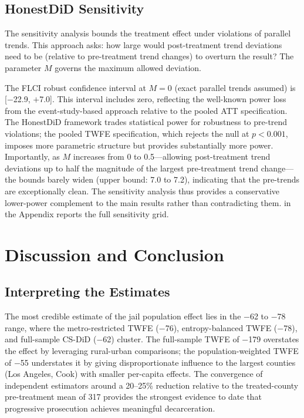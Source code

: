 \documentclass[12pt]{article}
\begin{document}


\subsection{HonestDiD Sensitivity}

The \citet{rambachan2023honest} sensitivity analysis bounds the treatment effect under violations of parallel trends. This approach asks: how large would post-treatment trend deviations need to be (relative to pre-treatment trend changes) to overturn the result? The parameter $M$ governs the maximum allowed deviation.

The FLCI robust confidence interval at $M = 0$ (exact parallel trends assumed) is [$-$22.9, $+$7.0]. This interval includes zero, reflecting the well-known power loss from the event-study-based approach relative to the pooled ATT specification. The HonestDiD framework trades statistical power for robustness to pre-trend violations; the pooled TWFE specification, which rejects the null at $p < 0.001$, imposes more parametric structure but provides substantially more power. Importantly, as $M$ increases from 0 to 0.5---allowing post-treatment trend deviations up to half the magnitude of the largest pre-treatment trend change---the bounds barely widen (upper bound: 7.0 to 7.2), indicating that the pre-trends are exceptionally clean. The sensitivity analysis thus provides a conservative lower-power complement to the main results rather than contradicting them.  in the Appendix reports the full sensitivity grid.


\section{Discussion and Conclusion}
\label{sec:discussion}

\subsection{Interpreting the Estimates}

The most credible estimate of the jail population effect lies in the $-$62 to $-$78 range, where the metro-restricted TWFE ($-$76), entropy-balanced TWFE ($-$78), and full-sample CS-DiD ($-$62) cluster. The full-sample TWFE of $-$179 overstates the effect by leveraging rural-urban comparisons; the population-weighted TWFE of $-$55 understates it by giving disproportionate influence to the largest counties (Los Angeles, Cook) with smaller per-capita effects. The convergence of independent estimators around a 20--25\% reduction relative to the treated-county pre-treatment mean of 317 provides the strongest evidence to date that progressive prosecution achieves meaningful decarceration.
\end{document}
